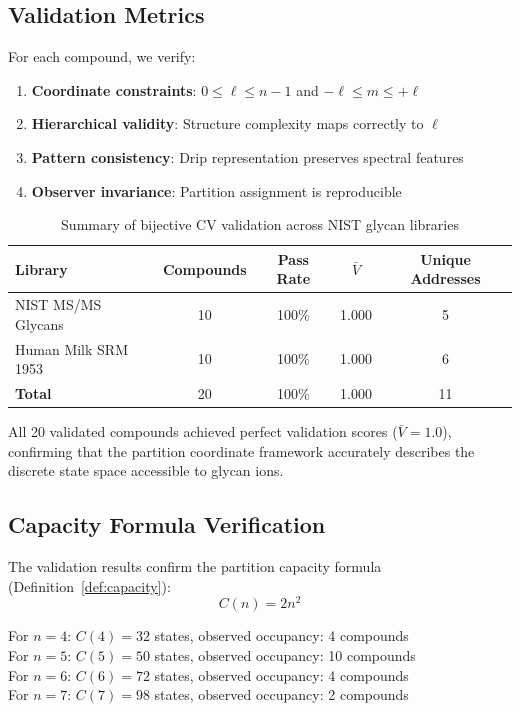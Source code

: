 \documentclass[twocolumn,10pt,a4paper]{article}
\theoremstyle{definition}
\theoremstyle{remark}
\begin{document}
\subsection{Validation Metrics}

For each compound, we verify:
\begin{enumerate}
    \item \textbf{Coordinate constraints}: $0 \leq \ell \leq n-1$ and $-\ell \leq m \leq +\ell$
    \item \textbf{Hierarchical validity}: Structure complexity maps correctly to $\ell$
    \item \textbf{Pattern consistency}: Drip representation preserves spectral features
    \item \textbf{Observer invariance}: Partition assignment is reproducible
\end{enumerate}

\begin{table}[H]
\centering
\caption{Summary of bijective CV validation across NIST glycan libraries}
\label{tab:validation_summary}
\begin{tabular}{lcccc}
\toprule
\textbf{Library} & \textbf{Compounds} & \textbf{Pass Rate} & \textbf{$\bar{V}$} & \textbf{Unique Addresses} \\
\midrule
NIST MS/MS Glycans & 10 & 100\% & 1.000 & 5 \\
Human Milk SRM 1953 & 10 & 100\% & 1.000 & 6 \\
\midrule
\textbf{Total} & 20 & 100\% & 1.000 & 11 \\
\bottomrule
\end{tabular}
\end{table}

All 20 validated compounds achieved perfect validation scores ($\bar{V} = 1.0$), confirming that the partition coordinate framework accurately describes the discrete state space accessible to glycan ions.

\subsection{Capacity Formula Verification}

The validation results confirm the partition capacity formula (Definition~\ref{def:capacity}):
\begin{equation}
    C(n) = 2n^2
\end{equation}

For $n=4$: $C(4) = 32$ states, observed occupancy: 4 compounds \\
For $n=5$: $C(5) = 50$ states, observed occupancy: 10 compounds \\
For $n=6$: $C(6) = 72$ states, observed occupancy: 4 compounds \\
For $n=7$: $C(7) = 98$ states, observed occupancy: 2 compounds
\end{document}
